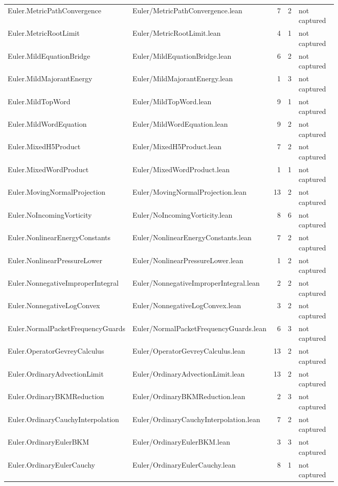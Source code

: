 \documentclass[10pt]{article}
\begin{document}
\begin{longtable}{p{0.28\linewidth}p{0.27\linewidth}r r p{0.20\linewidth}}
Euler.MetricPathConvergence & Euler/MetricPathConvergence.lean & 7 & 2 & not captured\\
Euler.MetricRootLimit & Euler/MetricRootLimit.lean & 4 & 1 & not captured\\
Euler.MildEquationBridge & Euler/MildEquationBridge.lean & 6 & 2 & not captured\\
Euler.MildMajorantEnergy & Euler/MildMajorantEnergy.lean & 1 & 3 & not captured\\
Euler.MildTopWord & Euler/MildTopWord.lean & 9 & 1 & not captured\\
Euler.MildWordEquation & Euler/MildWordEquation.lean & 9 & 2 & not captured\\
Euler.MixedH5Product & Euler/MixedH5Product.lean & 7 & 2 & not captured\\
Euler.MixedWordProduct & Euler/MixedWordProduct.lean & 1 & 1 & not captured\\
Euler.MovingNormalProjection & Euler/MovingNormalProjection.lean & 13 & 2 & not captured\\
Euler.NoIncomingVorticity & Euler/NoIncomingVorticity.lean & 8 & 6 & not captured\\
Euler.NonlinearEnergyConstants & Euler/NonlinearEnergyConstants.lean & 7 & 2 & not captured\\
Euler.NonlinearPressureLower & Euler/NonlinearPressureLower.lean & 1 & 2 & not captured\\
Euler.NonnegativeImproperIntegral & Euler/NonnegativeImproperIntegral.lean & 2 & 2 & not captured\\
Euler.NonnegativeLogConvex & Euler/NonnegativeLogConvex.lean & 3 & 2 & not captured\\
Euler.NormalPacketFrequencyGuards & Euler/NormalPacketFrequencyGuards.lean & 6 & 3 & not captured\\
Euler.OperatorGevreyCalculus & Euler/OperatorGevreyCalculus.lean & 13 & 2 & not captured\\
Euler.OrdinaryAdvectionLimit & Euler/OrdinaryAdvectionLimit.lean & 13 & 2 & not captured\\
Euler.OrdinaryBKMReduction & Euler/OrdinaryBKMReduction.lean & 2 & 3 & not captured\\
Euler.OrdinaryCauchyInterpolation & Euler/OrdinaryCauchyInterpolation.lean & 7 & 2 & not captured\\
Euler.OrdinaryEulerBKM & Euler/OrdinaryEulerBKM.lean & 3 & 3 & not captured\\
Euler.OrdinaryEulerCauchy & Euler/OrdinaryEulerCauchy.lean & 8 & 1 & not captured\\

\end{longtable}
\end{document}
